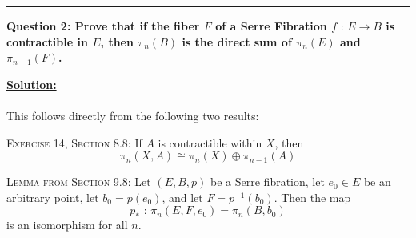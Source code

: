 \documentclass[11pt]{article}
\begin{document}



\vskip 0.5cm
\hrule
\pagebreak


\begin{bluebox}
  \textbf{Question 2: Prove that if the fiber $F$ of a Serre Fibration $f \text{ : } E \to B$ is contractible in $E$, then $\pi_n(B)$ is the direct sum of $\pi_n(E)$ and $\pi_{n-1}(F)$.} 
\end{bluebox}

\vskip 0.5cm
\textbf{\underline{Solution:}}
\\
\\
This follows directly from the following two results: 

\begin{redbox}
  \textsc{Exercise 14, Section 8.8:} If $A$ is contractible within $X$, then
  $$ \pi_n(X, A) \cong \pi_n(X) \oplus \pi_{n-1}(A) $$
\end{redbox}

\begin{redbox}
  \textsc{Lemma from Section 9.8:} Let $(E, B, p)$ be a Serre fibration, let $e_0 \in E$ be an arbitrary point, let $b_0 = p(e_0)$, and let $F = p^{-1}(b_0)$. Then the map $$ p_* \text{ : } \pi_n(E, F, e_0) = \pi_n(B, b_0) $$ is an isomorphism for all $n$.
\end{redbox} 
\end{document}
